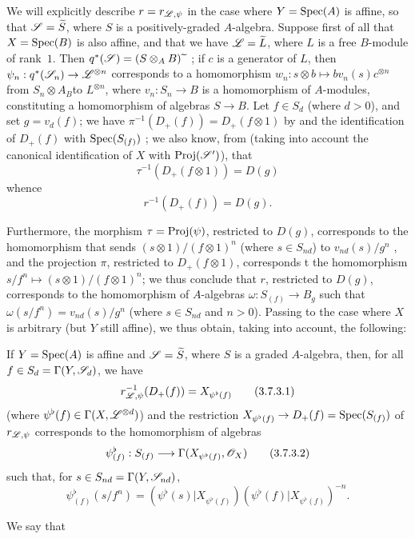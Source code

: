\begin{env}[3.7.2]
\label{II.3.7.2}
We will explicitly describe $r=r_{\mathscr{L},\psi}$ in the case where $Y=\operatorname{Spec}(A)$ is affine, so that $\mathscr{S}=\widetilde{S}$, where $S$ is a positively-graded $A$-algebra.
Suppose first of all that $X=\operatorname{Spec}(B)$ is also affine, and that we have $\mathscr{L}=\widetilde{L}$, where $L$ is a free $B$-module of rank~$1$.
Then $q^*(\mathscr{S})=(S\otimes_A B){\,\widetilde{\,}\,}$ ;
if $c$ is a generator of $L$, then $\psi_n:q^*(\sh{S}_n)\to\sh{L}^{\otimes n}$ corresponds to a homomorphism $w_n:s\otimes b\mapsto bv_n(s)c^{\otimes n}$ from $S_n\otimes A_ B$to $L^{\otimes n}$, where $v_n:S_n\to B$ is a homomorphism of $A$-modules, constituting a homomorphism of algebras $S\to B$.
Let $f\in S_d$ (where $d>0$), and set $g=v_d(f)$;
we have $\pi^{-1}(D_+(f))=D_+(f\otimes1)$ by  and the identification of $D_+(f)$ with $\operatorname{Spec}(S_{(f)})$ ;
we also know, from  (taking into account the canonical identification of $X$ with $\operatorname{Proj}(\mathscr{S}')$), that
\[
  \tau^{-1}(D_+(f\otimes1)) = D(g)
\]
whence
\[
\label{II.3.7.2.1}
  r^{-1}(D_+(f)) = D(g).
\tag{3.7.2.1}
\]

Furthermore, the morphism $\tau=\operatorname{Proj}(\psi)$, restricted to $D(g)$, corresponds to the homomorphism that sends $(s\otimes1)/(f\otimes1)^n$ (where $s\in S_{nd}$) to $v_{nd}(s)/g^n$ , and the projection $\pi$, restricted to $D_+(f\otimes1)$, corresponds t the homomorphism $s/f^n\mapsto(s\otimes1)/(f\otimes1)^n$;
we thus conclude that $r$, restricted to $D(g)$, corresponds to the homomorphism of $A$-algebras $\omega:S_{(f)}\to B_g$ such that $\omega(s/f^n)=v_{nd}(s)/g^n$ (where $s\in S_{nd}$ and $n>0$).
Passing to the case where $X$ is arbitrary (but $Y$ still affine), we thus obtain, taking  into account, the following:
\end{env}

\begin{proposition}[3.7.3]
\label{II.3.7.3}
If $Y=\operatorname{Spec}(A)$ is affine and $\mathscr{S}=\widetilde{S}$, where $S$ is a graded $A$-algebra, then, for all $f\in S_d=\Gamma(Y,\mathscr{S}_d)$, we have
\[
\label{II.3.7.3.1}
  r_{\mathscr{L},\psi}^{-1}(D_+(f)) = X_{\psi^\flat(f)}
\tag{3.7.3.1}
\]
(where $\psi^\flat(f)\in\Gamma(X,\mathscr{L}^{\otimes d})$) and the restriction $X_{\psi^\flat(f)}\to D_+(f)=\Spec(S_{(f)})$ of $r_{\mathscr{L},\psi}$ corresponds  to the homomorphism of algebras
\[
\label{II.3.7.3.2}
  \psi_{(f)}^\flat : S_{(f)} \to \Gamma(X_{\psi^\flat(f)},\sh{O}_X)
\tag{3.7.3.2}
\]
such that, for $s\in S_{nd}=\Gamma(Y,\mathscr{S}_{nd})$,
\[
\label{II.3.7.3.3}
  \psi_{(f)}^\flat(s/f^n) = (\psi^\flat(s)|X_{\psi^\flat(f)})(\psi^\flat(f)|X_{\psi^\flat(f)})^{-n}.
\tag{3.7.3.3}
\]
\end{proposition}

We say that


